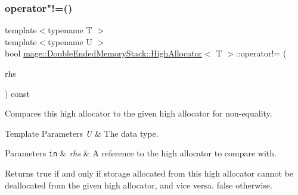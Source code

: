 \subsubsection{\texorpdfstring{operator"!=()}{operator!=()}}
{\footnotesize\ttfamily template$<$typename T $>$ \\
template$<$typename U $>$ \\
bool \mbox{\hyperlink{classmage_1_1_double_ended_memory_stack_1_1_high_allocator}{mage\+::\+Double\+Ended\+Memory\+Stack\+::\+High\+Allocator}}$<$ T $>$\+::operator!= (\begin{DoxyParamCaption}\item[{const \mbox{\hyperlink{classmage_1_1_double_ended_memory_stack_1_1_high_allocator}{High\+Allocator}}$<$ U $>$ \&}]{rhs }\end{DoxyParamCaption}) const\hspace{0.3cm}{\ttfamily [noexcept]}}

Compares this high allocator to the given high allocator for non-\/equality.


\begin{DoxyTemplParams}{Template Parameters}
{\em U} & The data type. \\
\hline
\end{DoxyTemplParams}

\begin{DoxyParams}[1]{Parameters}
\mbox{\tt in}  & {\em rhs} & A reference to the high allocator to compare with. \\
\hline
\end{DoxyParams}
\begin{DoxyReturn}{Returns}
{\ttfamily true} if and only if storage allocated from this high allocator cannot be deallocated from the given high allocator, and vice versa. {\ttfamily false} otherwise. 
\end{DoxyReturn}
\mbox{\label{classmage_1_1_double_ended_memory_stack_1_1_high_allocator_acf31dee2d290adef5221cc3b012ce902}} 
